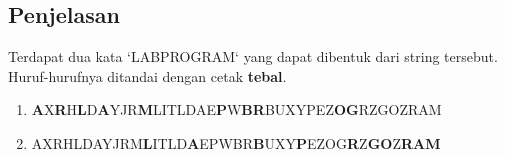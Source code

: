 \documentclass{article}
\begin{document}
\subsection*{Penjelasan}
Terdapat dua kata `LABPROGRAM` yang dapat dibentuk dari string tersebut. Huruf-hurufnya ditandai dengan cetak \textbf{tebal}.
\begin{enumerate}
    \item \textbf{A}X\textbf{R}H\textbf{L}D\textbf{A}YJR\textbf{M}LITLDAE\textbf{P}W\textbf{BR}BUXYPEZ\textbf{OG}RZGOZRAM
    \item AXRHLDAYJRM\textbf{L}ITLD\textbf{A}EPWBR\textbf{B}UXY\textbf{P}EZOG\textbf{R}Z\textbf{GO}Z\textbf{RAM}
\end{enumerate}
\end{document}
